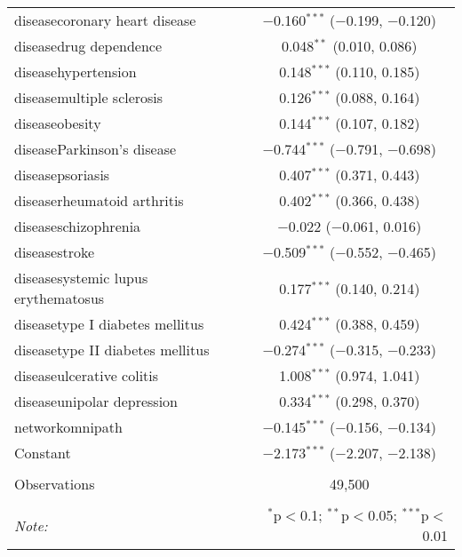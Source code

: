 \begin{table}[!htbp]
\begin{tabular}{@{\extracolsep{5pt}}lc}
  diseasecoronary heart disease & $-$0.160$^{***}$ ($-$0.199, $-$0.120) \\ 
  diseasedrug dependence & 0.048$^{**}$ (0.010, 0.086) \\ 
  diseasehypertension & 0.148$^{***}$ (0.110, 0.185) \\ 
  diseasemultiple sclerosis & 0.126$^{***}$ (0.088, 0.164) \\ 
  diseaseobesity & 0.144$^{***}$ (0.107, 0.182) \\ 
  diseaseParkinson's disease & $-$0.744$^{***}$ ($-$0.791, $-$0.698) \\ 
  diseasepsoriasis & 0.407$^{***}$ (0.371, 0.443) \\ 
  diseaserheumatoid arthritis & 0.402$^{***}$ (0.366, 0.438) \\ 
  diseaseschizophrenia & $-$0.022 ($-$0.061, 0.016) \\ 
  diseasestroke & $-$0.509$^{***}$ ($-$0.552, $-$0.465) \\ 
  diseasesystemic lupus erythematosus & 0.177$^{***}$ (0.140, 0.214) \\ 
  diseasetype I diabetes mellitus & 0.424$^{***}$ (0.388, 0.459) \\ 
  diseasetype II diabetes mellitus & $-$0.274$^{***}$ ($-$0.315, $-$0.233) \\ 
  diseaseulcerative colitis & 1.008$^{***}$ (0.974, 1.041) \\ 
  diseaseunipolar depression & 0.334$^{***}$ (0.298, 0.370) \\ 
  networkomnipath & $-$0.145$^{***}$ ($-$0.156, $-$0.134) \\ 
  Constant & $-$2.173$^{***}$ ($-$2.207, $-$2.138) \\ 
 \hline \\[-1.8ex] 
Observations & 49,500 \\ 
\hline 
\hline \\[-1.8ex] 
\textit{Note:}  & \multicolumn{1}{r}{$^{*}$p$<$0.1; $^{**}$p$<$0.05; $^{***}$p$<$0.01} \\ 
\end{tabular} 
\end{table} 

